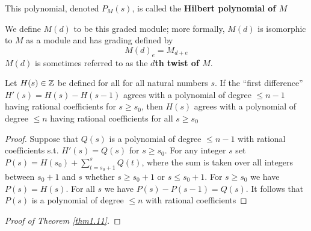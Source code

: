 \documentclass[11pt]{article}
\begin{document}
\begin{definition}[]
This polynomial, denoted \(P_M(s)\), is called the \textbf{Hilbert polynomial of \(M\)}
\end{definition}

We define \(M(d)\) to be this graded module; more formally, \(M(d)\) is
isomorphic to \(M\) as a module and has grading defined by
\begin{equation*}
M(d)_e=M_{d+e}
\end{equation*}
\(M(d)\) is sometimes referred to as the \textbf{\(d\)th twist of \(M\)}.

\begin{lemma}[]
Let \(H(s)\in\mathbb{Z}\) be defined for all for all natural numbers \(s\). If the
``first difference'' \(H'(s)=H(s)-H(s-1)\) agrees with a polynomial of degree
\(\le n-1\) having rational coefficients for \(s\ge s_0\), then \(H(s)\)
agrees with a polynomial of degree \(\le n\) having rational coefficients for
all \(s\ge s_0\)
\end{lemma}

\begin{proof}
Suppose that \(Q(s)\) is a polynomial of degree \(\le n-1\) with rational
coefficients s.t. \(H'(s)=Q(s)\) for \(s\ge s_0\). For any integer \(s\) set
\(P(s)=H(s_0)+\sum_{t=s_0+1}^sQ(t)\), where the sum is taken over all
integers between \(s_0+1\) and \(s\) whether \(s\ge s_0+1\) or \(s\le
   s_0+1\).
For \(s\ge s_0\) we have \(P(s)=H(s)\). For all \(s\) we have
\(P(s)-P(s-1)=Q(s)\). It follows that \(P(s)\) is a polynomial of degree
\(\le n\) with rational coefficients
\end{proof}

\begin{proof}[Proof of Theorem \ref{thm1.11}]

\end{proof}
\end{document}
